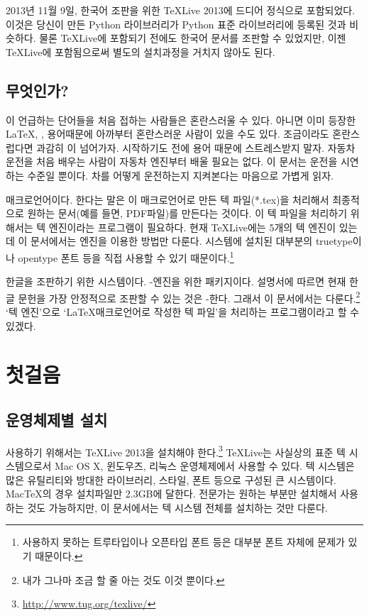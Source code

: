 \documentclass[oneside, chapter, 11pt]{oblivoir}
\begin{document}
2013년 11월 9일, 한국어 조판을 위한  TeXLive 2013에 드디어 정식으로 포함되었다. 이것은 당신이 만든 Python 라이브러리가 Python 표준 라이브러리에 등록된 것과 비슷하다. 물론 TeXLive에 포함되기 전에도  한국어 문서를 조판할 수 있었지만, 이젠 TeXLive에 포함됨으로써 별도의 설치과정을 거치지 않아도 된다.

\section{ 무엇인가?}
이  언급하는 단어들을 처음 접하는 사람들은 혼란스러울 수 있다. 아니면 이미 등장한 \LaTeX, \koTeX,  용어때문에 아까부터 혼란스러운 사람이 있을 수도 있다. 조금이라도 혼란스럽다면 과감히 이  넘어가자. 시작하기도 전에 용어 때문에 스트레스받지 말자. 자동차 운전을 처음 배우는 사람이 자동차 엔진부터 배울 필요는 없다. 이 문서는 운전을 시연하는 수준일 뿐이다.  차를 어떻게 운전하는지 지켜본다는 마음으로 가볍게 읽자.

 매크로언어이다.  한다는 말은 이 매크로언어로 만든 텍 파일(*.tex)을 처리해서 최종적으로 원하는 문서(예를 들면, PDF파일)를 만든다는 것이다. 이 텍 파일을 처리하기 위해서는 텍 엔진이라는 프로그램이 필요하다. 현재 TeXLive에는 5개의 텍 엔진이 있는데 이 문서에서는  엔진을 이용한 방법만 다룬다.  시스템에 설치된 대부분의 truetype이나 opentype 폰트 등을 직접 사용할 수 있기 때문이다.\footnote{ 사용하지 못하는 트루타입이나 오픈타입 폰트 등은 대부분 폰트 자체에 문제가 있기 때문이다.}

  한글을 조판하기 위한 시스템이다. \XeTeX- \XeTeX 엔진을 위한 \koTeX 패키지이다.  설명서에 따르면 현재 한글 문헌을 가장 안정적으로 조판할 수 있는 것은 \XeTeX- 한다. 그래서 이 문서에서는  다룬다.\footnote{내가 그나마 조금 할 줄 아는 것도 이것 뿐이다.}  ` 텍 엔진'으로 `\LaTeX 매크로언어로 작성한 텍 파일'을 처리하는 프로그램이라고 할 수 있겠다.

\mainmatter
\chapter{첫걸음}
\section{운영체제별 설치}
 사용하기 위해서는 TeXLive 2013을 설치해야 한다.\footnote{\href{http://www.tug.org/texlive/}{http://www.tug.org/texlive/}} TeXLive는 사실상의 표준 텍 시스템으로서 Mac OS X, 윈도우즈, 리눅스 운영체제에서 사용할 수 있다. 텍 시스템은 많은 유틸리티와 방대한 라이브러리, 스타일, 폰트 등으로 구성된 큰 시스템이다. MacTeX의 경우 설치파일만 2.3GB에 달한다. 전문가는 원하는 부분만 설치해서 사용하는 것도 가능하지만, 이 문서에서는 텍 시스템 전체를 설치하는 것만 다룬다.
\end{document}
